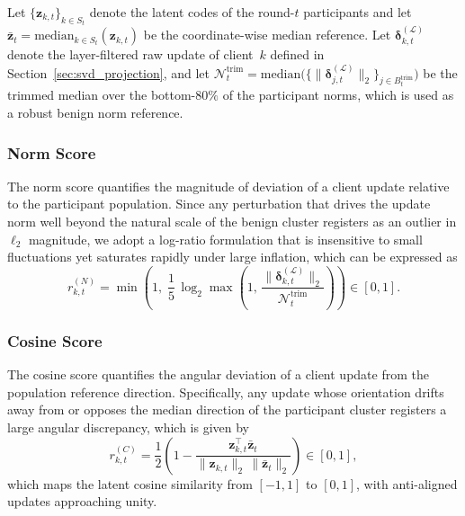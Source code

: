 \documentclass[journal]{IEEEtran}
\begin{document}
Let $\{\mathbf{z}_{k,t}\}_{k\in S_t}$ denote the latent codes of the round-$t$ participants and let $\bar{\mathbf{z}}_t = \mathrm{median}_{k \in S_t}(\mathbf{z}_{k,t})$ be the coordinate-wise median reference. Let $\boldsymbol{\delta}_{k,t}^{(\mathcal{L})}$ denote the layer-filtered raw update of client~$k$ defined in Section~\ref{sec:svd_projection}, and let $\mathcal{N}_t^{\mathrm{trim}} = \mathrm{median}\bigl(\bigl\{\|\boldsymbol{\delta}_{j,t}^{(\mathcal{L})}\|_2\bigr\}_{j \in B_t^{\mathrm{trim}}}\bigr)$ be the trimmed median over the bottom-$80\%$ of the participant norms, which is used as a robust benign norm reference.

\subsubsection{Norm Score}
The norm score quantifies the magnitude of deviation of a client update relative to the participant population. Since any perturbation that drives the update norm well beyond the natural scale of the benign cluster registers as an outlier in $\ell_2$ magnitude, we adopt a log-ratio formulation that is insensitive to small fluctuations yet saturates rapidly under large inflation, which can be expressed as
\begin{equation}
r_{k,t}^{(N)} = \min\!\left(1,\; \frac{1}{5}\,\log_2\max\!\left(1,\, \frac{\|\boldsymbol{\delta}_{k,t}^{(\mathcal{L})}\|_2}{\mathcal{N}_t^{\mathrm{trim}}}\right)\right) \in [0,1].
\label{eq:norm_score}
\end{equation}

\subsubsection{Cosine Score}
The cosine score quantifies the angular deviation of a client update from the population reference direction. Specifically, any update whose orientation drifts away from or opposes the median direction of the participant cluster registers a large angular discrepancy, which is given by
\begin{equation}
r_{k,t}^{(C)} = \frac{1}{2}\!\left(1 - \frac{\mathbf{z}_{k,t}^{\!\top} \bar{\mathbf{z}}_t}{\|\mathbf{z}_{k,t}\|_2 \, \|\bar{\mathbf{z}}_t\|_2}\right) \in [0,1],
\label{eq:cos_score}
\end{equation}
which maps the latent cosine similarity from $[-1,1]$ to $[0,1]$, with anti-aligned updates approaching unity.
\end{document}
